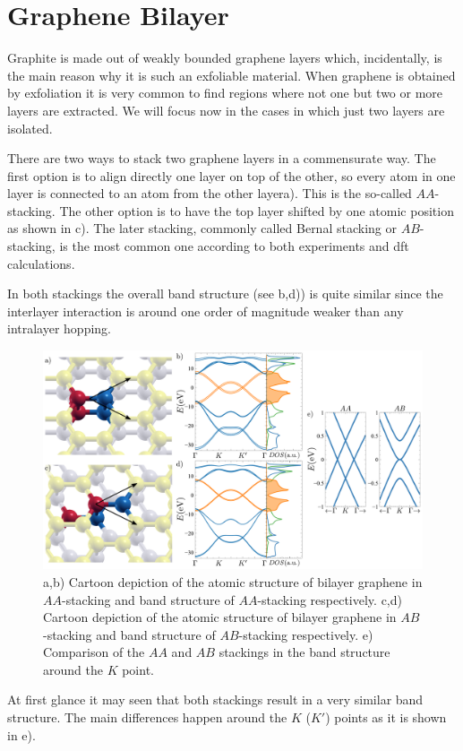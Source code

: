 \chapter{Graphene Bilayer}
\label{ch:bilayer}
Graphite is made out of weakly bounded graphene layers which, incidentally, is the main reason why it is such an exfoliable material. When graphene is obtained by exfoliation it is very common to find regions where not one but two or more layers are extracted. We will focus now in the cases in which just two layers are isolated.

There are two ways to stack two graphene layers in a commensurate way. The first option is to align directly one layer on top of the other, so every atom in one layer is connected to an atom from the other layera). This is the so-called $AA$-stacking.
The other option is to have the top layer shifted by one atomic position as shown in c). The later stacking, commonly called Bernal stacking or $AB$-stacking, is the most common one according to both experiments and \ac{dft} calculations\cite{Norimatsu2010,Charlier1994,Charlier1994a}.

In both stackings the overall band structure (see b,d)) is quite similar since the interlayer interaction is around one order of magnitude weaker than any intralayer hopping.
\begin{figure}[h!]
\centering
\includegraphics{graphene_bilayer/figures/bilayer_stackings.pdf}
\vspace{-10pt}
\caption{a,b) Cartoon depiction of the atomic structure of bilayer graphene in $AA$-stacking and band structure of $AA$-stacking respectively. c,d) Cartoon depiction of the atomic structure of bilayer graphene in $AB$-stacking and band structure of $AB$-stacking respectively. e) Comparison of the $AA$ and $AB$ stackings in the band structure around the $K$ point.}
\label{Gbi_stack}
\end{figure}
At first glance it may seen that both stackings result in a very similar band structure. The main differences happen around the $K$ ($K'$) points as it is shown in e).

